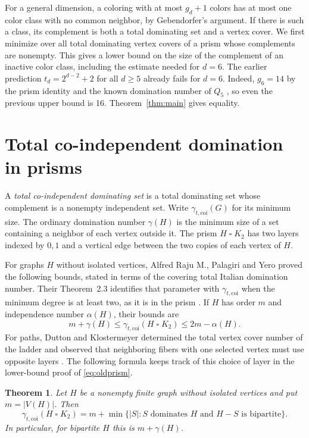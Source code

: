 \documentclass[11pt,a4paper]{article}
\newtheorem{theorem}{Theorem}
\newcommand{\coi}{\gamma_{t,\mathrm{coi}}}
\newcommand{\boxprod}{\mathbin{\square}}
\begin{document}
For a general dimension, a coloring with at most $g_d+1$ colors has at
most one color class with no common neighbor, by Gebendorfer's argument.
If there is such a class, its complement is both a total dominating set
and a vertex cover. We first minimize over all total dominating vertex
covers of a prism whose complements are nonempty. This gives a lower
bound on the size of the complement of an inactive color class, including
the estimate needed for $d=6$.
The earlier prediction $t_d=2^{d-2}+2$ for all $d\ge5$
\cite[Conjecture 4.10]{kazemi14} already fails for $d=6$.
Indeed, $g_6=14$ by the prism identity \cite{prisms} and the known
domination number of $Q_5$ \cite[Table 1.1]{kazemi26}, so even the
previous upper bound is 16. Theorem~\ref{thm:main} gives equality.

\section{Total co-independent domination in prisms}

A \emph{total co-independent dominating set} is a total dominating set
whose complement is a nonempty independent set. Write $\coi(G)$ for its
minimum size. The ordinary domination number $\gamma(H)$ is the minimum
size of a set containing a neighbor of each vertex outside it. The prism $H\boxprod K_2$ has two layers indexed by $0,1$ and a
vertical edge between the two copies of each vertex of $H$.

For graphs $H$ without isolated vertices, Alfred Raju M., Palagiri and
Yero proved the following bounds, stated in terms of the covering total
Italian domination number. Their Theorem~2.3 identifies that parameter
with $\coi$ when the minimum degree is at least two, as it is in the prism
\cite[Theorems 2.3 and 5.1]{italian}. If $H$ has order $m$ and
independence number $\alpha(H)$, their bounds are
\begin{equation}\label{eq:oldprism}
 m+\gamma(H)\le\coi(H\boxprod K_2)\le 2m-\alpha(H).
\end{equation}
For paths, Dutton and Klostermeyer determined the total vertex cover
number of the ladder and observed that neighboring fibers with one
selected vertex must use opposite layers \cite[Proposition 30]{dutton}.
The following formula keeps track of this choice of layer in the
lower-bound proof of \eqref{eq:oldprism}.

\begin{theorem}\label{thm:prism}
Let $H$ be a nonempty finite graph without isolated vertices and put
$m=|V(H)|$. Then
\[
  \coi(H\boxprod K_2)
  =m+\min\{|S|: S\text{ dominates }H\text{ and }H-S\text{ is bipartite}\}.
\]
In particular, for bipartite $H$ this is $m+\gamma(H)$.
\end{theorem}
\end{document}

